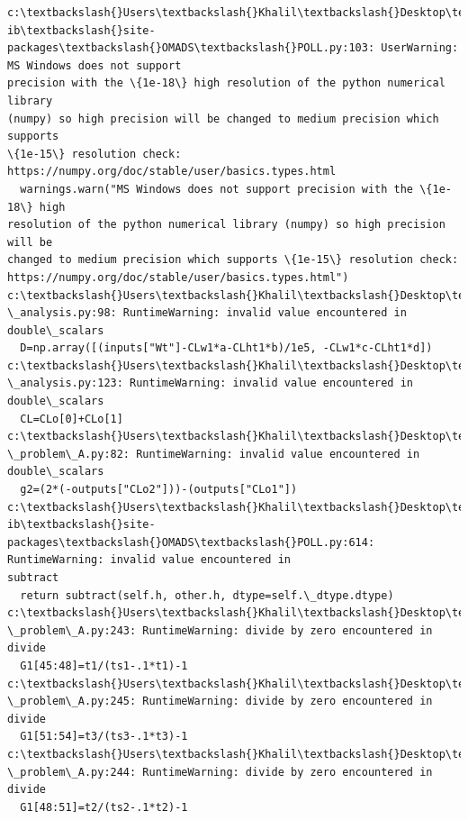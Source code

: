 \documentclass[11pt]{article}
\begin{document}
    \begin{Verbatim}[commandchars=\\\{\}]
c:\textbackslash{}Users\textbackslash{}Khalil\textbackslash{}Desktop\textbackslash{}Documents\textbackslash{}MECH\_559\_material\textbackslash{}MECH559\_notebooks\textbackslash{}.env.win\textbackslash{}l
ib\textbackslash{}site-packages\textbackslash{}OMADS\textbackslash{}POLL.py:103: UserWarning: MS Windows does not support
precision with the \{1e-18\} high resolution of the python numerical library
(numpy) so high precision will be changed to medium precision which supports
\{1e-15\} resolution check: https://numpy.org/doc/stable/user/basics.types.html
  warnings.warn("MS Windows does not support precision with the \{1e-18\} high
resolution of the python numerical library (numpy) so high precision will be
changed to medium precision which supports \{1e-15\} resolution check:
https://numpy.org/doc/stable/user/basics.types.html")
c:\textbackslash{}Users\textbackslash{}Khalil\textbackslash{}Desktop\textbackslash{}Documents\textbackslash{}MECH\_559\_material\textbackslash{}MECH559\_notebooks\textbackslash{}10\_mdo\textbackslash{}SBJ
\_analysis.py:98: RuntimeWarning: invalid value encountered in double\_scalars
  D=np.array([(inputs["Wt"]-CLw1*a-CLht1*b)/1e5, -CLw1*c-CLht1*d])
c:\textbackslash{}Users\textbackslash{}Khalil\textbackslash{}Desktop\textbackslash{}Documents\textbackslash{}MECH\_559\_material\textbackslash{}MECH559\_notebooks\textbackslash{}10\_mdo\textbackslash{}SBJ
\_analysis.py:123: RuntimeWarning: invalid value encountered in double\_scalars
  CL=CLo[0]+CLo[1]
c:\textbackslash{}Users\textbackslash{}Khalil\textbackslash{}Desktop\textbackslash{}Documents\textbackslash{}MECH\_559\_material\textbackslash{}MECH559\_notebooks\textbackslash{}10\_mdo\textbackslash{}SBJ
\_problem\_A.py:82: RuntimeWarning: invalid value encountered in double\_scalars
  g2=(2*(-outputs["CLo2"]))-(outputs["CLo1"])
c:\textbackslash{}Users\textbackslash{}Khalil\textbackslash{}Desktop\textbackslash{}Documents\textbackslash{}MECH\_559\_material\textbackslash{}MECH559\_notebooks\textbackslash{}.env.win\textbackslash{}l
ib\textbackslash{}site-packages\textbackslash{}OMADS\textbackslash{}POLL.py:614: RuntimeWarning: invalid value encountered in
subtract
  return subtract(self.h, other.h, dtype=self.\_dtype.dtype)
c:\textbackslash{}Users\textbackslash{}Khalil\textbackslash{}Desktop\textbackslash{}Documents\textbackslash{}MECH\_559\_material\textbackslash{}MECH559\_notebooks\textbackslash{}10\_mdo\textbackslash{}SBJ
\_problem\_A.py:243: RuntimeWarning: divide by zero encountered in divide
  G1[45:48]=t1/(ts1-.1*t1)-1
c:\textbackslash{}Users\textbackslash{}Khalil\textbackslash{}Desktop\textbackslash{}Documents\textbackslash{}MECH\_559\_material\textbackslash{}MECH559\_notebooks\textbackslash{}10\_mdo\textbackslash{}SBJ
\_problem\_A.py:245: RuntimeWarning: divide by zero encountered in divide
  G1[51:54]=t3/(ts3-.1*t3)-1
c:\textbackslash{}Users\textbackslash{}Khalil\textbackslash{}Desktop\textbackslash{}Documents\textbackslash{}MECH\_559\_material\textbackslash{}MECH559\_notebooks\textbackslash{}10\_mdo\textbackslash{}SBJ
\_problem\_A.py:244: RuntimeWarning: divide by zero encountered in divide
  G1[48:51]=t2/(ts2-.1*t2)-1
    \end{Verbatim}
\end{document}
